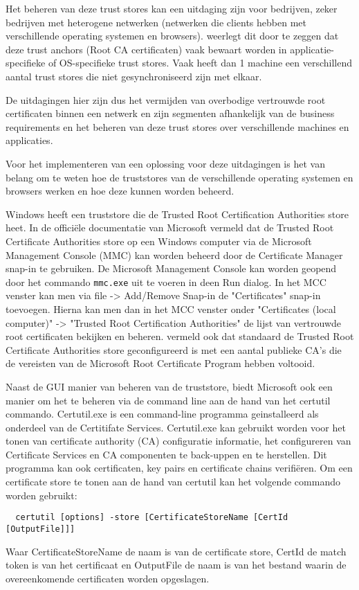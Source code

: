 Het beheren van deze trust stores kan een uitdaging zijn voor bedrijven, zeker bedrijven met heterogene netwerken (netwerken die clients hebben met verschillende operating systemen en browsers).
\textcite{rfc6024} weerlegt dit door te zeggen dat deze trust anchors (Root CA certificaten) vaak bewaart worden in applicatie-specifieke of OS-specifieke trust stores.
Vaak heeft dan 1 machine een verschillend aantal trust stores die niet gesynchroniseerd zijn met elkaar. \break

De uitdagingen hier zijn dus het vermijden van overbodige vertrouwde root certificaten binnen een netwerk en zijn segmenten afhankelijk van de business requirements en het beheren van deze trust stores over verschillende machines en applicaties. 

\label{sec:Verschillende truststores}

Voor het implementeren van een oplossing voor deze uitdagingen is het van belang om te weten hoe de truststores van de verschillende operating systemen en browsers werken en hoe deze kunnen worden beheerd. \break

Windows heeft een truststore die de Trusted Root Certification Authorities store heet.
In de officiële documentatie van Microsoft vermeld \textcite{MStruststore} dat de Trusted Root Certificate Authorities store op een Windows computer via de Microsoft Management Console (MMC) kan worden beheerd door de Certificate Manager snap-in te gebruiken.
De Microsoft Management Console kan worden geopend door het commando \texttt{mmc.exe} uit te voeren in deen Run dialog. In het MCC venster kan men via file -> Add/Remove Snap-in de "Certificates" snap-in toevoegen.
Hierna kan men dan in het MCC venster onder "Certificates (local computer)" -> "Trusted Root Certification Authorities" de lijst van vertrouwde root certificaten bekijken en beheren.
\textcite{MStruststore} vermeld ook dat standaard de Trusted Root Certificate Authorities store geconfigureerd is met een aantal publieke CA's die de vereisten van de Microsoft Root Certificate Program hebben voltooid. \break

Naast de GUI manier van beheren van de truststore, biedt Microsoft ook een manier om het te beheren via de command line aan de hand van het certutil commando.
Certutil.exe is een command-line programma geinstalleerd als onderdeel van de Certitifate Services. Certutil.exe kan gebruikt worden voor het tonen van certificate authority (CA) configuratie informatie, het configureren van Certificate Services en CA componenten te back-uppen en te herstellen.
Dit programma kan ook certificaten, key pairs en certificate chains verifiëren. \autocite{MScertutil}
Om een certificate store te tonen aan de hand van certutil kan het volgende commando worden gebruikt:
\begin{verbatim}
  certutil [options] -store [CertificateStoreName [CertId [OutputFile]]]
\end{verbatim}
Waar CertificateStoreName de naam is van de certificate store, CertId de match token is van het certificaat en OutputFile de naam is van het bestand waarin de overeenkomende certificaten worden opgeslagen. \autocite{MScertutil}

